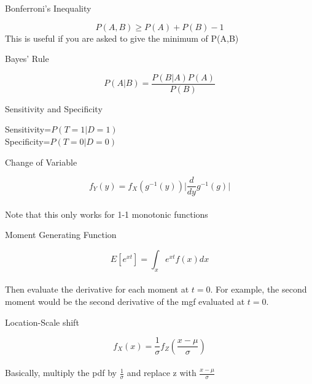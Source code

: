 \documentclass[avery5388,grid,frame]{flashcards}
\begin{document}

\begin{flashcard}[Definition]{Bonferroni's Inequality}
\begin{center}
\bigskip\bigskip\bigskip
\begin{equation*}
P(A, B)\geq P(A)+P(B)-1
\end{equation*}
This is useful if you are asked to give the minimum of P(A,B) 
\end{center}
\end{flashcard}
\begin{flashcard}[Definition]{Bayes' Rule}
\begin{center}
\bigskip\bigskip\bigskip
\begin{equation*}
P(A|B)=\frac{P(B|A)P(A)}{P(B)}
\end{equation*}
\end{center}
\end{flashcard}
\begin{flashcard}[Definition]{Sensitivity and Specificity}
\begin{center}
\bigskip\bigskip\bigskip
Sensitivity=$P(T=1|D=1)$\\
\bigskip
Specificity=$P(T=0|D=0)$
\end{center}
\end{flashcard}
\begin{flashcard}[Equation]{Change of Variable}
\begin{center}
\bigskip\bigskip\bigskip
\begin{equation*}
f_Y(y)=f_X(g^{-1}(y))\Big|\frac{d}{dy}g^{-1}(g)\Big|
\end{equation*}
\bigskip\\
Note that this only works for 1-1 monotonic functions
\end{center}
\end{flashcard}
\begin{flashcard}[Equation]{Moment Generating Function}
\begin{center}
\bigskip\bigskip\bigskip
\begin{equation*}
E[e^{xt}]=\int_xe^{xt}f(x)dx
\end{equation*}
\bigskip\\
Then evaluate the derivative for each moment at $t=0$. For example, the second moment would be the second derivative of the mgf evaluated at $t=0$.
\end{center}
\end{flashcard}
\begin{flashcard}[Equation]{Location-Scale shift}
\begin{center}
\bigskip\bigskip\bigskip
\begin{equation*}
f_X(x)=\frac{1}{\sigma}f_Z\left(\frac{x-\mu}{\sigma}\right)
\end{equation*}
\bigskip\\
Basically, multiply the pdf by $\frac{1}{\sigma}$ and replace z with $\frac{x-\mu}{\sigma}$
\end{center}
\end{flashcard}
\end{document}
